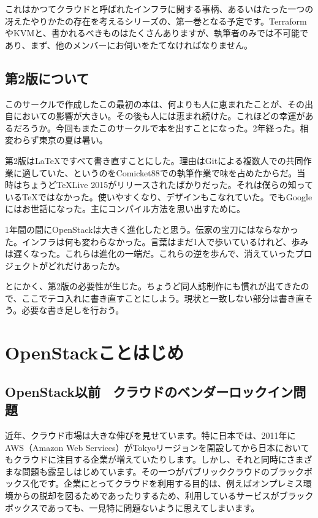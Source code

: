 \documentclass[9pt,b5paper,tombo,openany,dvipdfmx]{jsbook}
\begin{document}
これはかつてクラウドと呼ばれたインフラに関する事柄、あるいはたった一つの冴えたやりかたの存在を考えるシリーズの、第一巻となる予定です。TerraformやKVMと、書かれるべきものはたくさんありますが、執筆者のみでは不可能であり、まず、他のメンバーにお伺いをたてなければなりません。

\section{第2版について}

このサークルで作成したこの最初の本は、何よりも人に恵まれたことが、その出自においての影響が大きい。その後も人には恵まれ続けた。これほどの幸運があるだろうか。今回もまたこのサークルで本を出すことになった。2年経った。相変わらず東京の夏は暑い。

第2版は\LaTeX ですべて書き直すことにした。理由はGitによる複数人での共同作業に適していた、というのをComicket88での執筆作業で味を占めたからだ。当時はちょうど\TeX Live 2015がリリースされたばかりだった。それは僕らの知っている\TeX ではなかった。使いやすくなり、デザインもこなれていた。でもGoogleにはお世話になった。主にコンパイル方法を思い出すために。

1年間の間にOpenStackは大きく進化したと思う。伝家の宝刀にはならなかった。インフラは何も変わらなかった。言葉はまだ1人で歩いているけれど、歩みは遅くなった。これらは進化の一端だ。これらの逆を歩んで、消えていったプロジェクトがどれだけあったか。

とにかく、第2版の必要性が生じた。ちょうど同人誌制作にも慣れが出てきたので、ここでテコ入れに書き直すことにしよう。現状と一致しない部分は書き直そう。必要な書き足しを行おう。

\chapter{OpenStackことはじめ}

\section{OpenStack以前 ~クラウドのベンダーロックイン問題}

近年、クラウド市場は大きな伸びを見せています。特に日本では、2011年にAWS（Amazon Web Services）がTokyoリージョンを開設してから日本においてもクラウドに注目する企業が増えていたりします。しかし、それと同時にさまざまな問題も露呈しはじめています。その一つがパブリッククラウドのブラックボックス化です。企業にとってクラウドを利用する目的は、例えばオンプレミス環境からの脱却を図るためであったりするため、利用しているサービスがブラックボックスであっても、一見特に問題ないように思えてしまいます。
\end{document}
